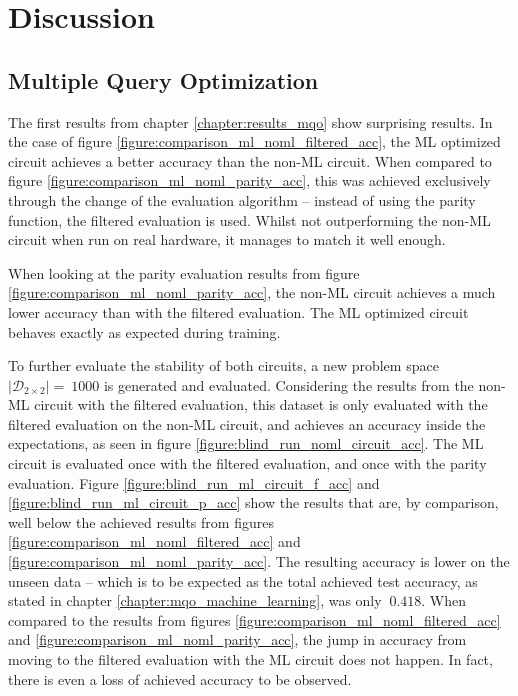 \chapter{Discussion} %

\label{chapter:discussion} %



\section{Multiple Query Optimization}

The first results from chapter \ref{chapter:results_mqo} show surprising results. In the case of figure \ref{figure:comparison_ml_noml_filtered_acc}, the ML optimized circuit achieves a better accuracy than the non-ML circuit. When compared to figure \ref{figure:comparison_ml_noml_parity_acc}, this was achieved exclusively through the change of the evaluation algorithm – instead of using the parity function, the filtered evaluation is used. Whilst not outperforming the non-ML circuit when run on real hardware, it manages to match it well enough.\par
When looking at the parity evaluation results from figure \ref{figure:comparison_ml_noml_parity_acc}, the non-ML circuit achieves a much lower accuracy than with the filtered evaluation. The ML optimized circuit behaves exactly as expected during training.\par
To further evaluate the stability of both circuits, a new problem space $\left|\mathcal{D}_{2\times2}\right| =\ 1000$ is generated and evaluated. Considering the results from the non-ML circuit with the filtered evaluation, this dataset is only evaluated with the filtered evaluation on the non-ML circuit, and achieves an accuracy inside the expectations, as seen in figure \ref{figure:blind_run_noml_circuit_acc}. The ML circuit is evaluated once with the filtered evaluation, and once with the parity evaluation. Figure \ref{figure:blind_run_ml_circuit_f_acc} and \ref{figure:blind_run_ml_circuit_p_acc} show the results that are, by comparison, well below the achieved results from figures \ref{figure:comparison_ml_noml_filtered_acc} and \ref{figure:comparison_ml_noml_parity_acc}. The resulting accuracy is lower on the unseen data – which is to be expected as the total achieved test accuracy, as stated in chapter \ref{chapter:mqo_machine_learning}, was only $~0.418$. When compared to the results from figures \ref{figure:comparison_ml_noml_filtered_acc} and \ref{figure:comparison_ml_noml_parity_acc}, the jump in accuracy from moving to the filtered evaluation with the ML circuit does not happen. In fact, there is even a loss of achieved accuracy to be observed. \par

